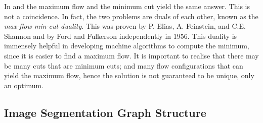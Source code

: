 In  and  the maximum flow and the minimum cut yield the same answer. This is not a coincidence. In fact, the two problems are duals of each other, known as the \textit{max-flow min-cut duality}. This was proven by P. Elias, A. Feinstein, and C.E. Shannon \citep{Elias1956} and by Ford and Fulkerson \citep{Ford1956} independently in 1956. This duality is immensely helpful in developing machine algorithms to compute the minimum, since it is easier to find a maximum flow. It is important to realise that there may be many cuts that are minimum cuts; and many flow configurations that can yield the maximum flow, hence the solution is not guaranteed to be unique, only an optimum.


\subsection{Image Segmentation Graph Structure}
\label{sec:GraphCutFramework}

